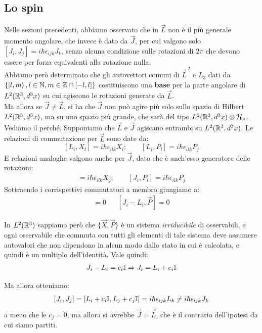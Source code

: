 \documentclass[../../FisicaTeorica.tex]{subfiles}
\begin{document}
\subsection{Lo spin}%
Nelle sezioni precedenti, abbiamo osservato che in \MQ $\vec{L}$ non è il più generale momento angolare, che invece è dato da $\vec{J}$, per cui valgono solo $[J_i, J_j]=i\hbar \epsilon_{ijk}J_k$, senza alcuna condizione sulle rotazioni di $2\pi$ che devono essere per forza equivalenti alla rotazione nulla.\\
Abbiamo però determinato che gli autovettori comuni di $\vec{L}^{\,2}$ e $L_3$ dati da $\{\ket{l,m}, l\in \mathbb{N}, m \in \mathbb{Z}\cap [-l,l]\}$ costituiscono una \textbf{base} per la parte angolare di $L^2(\mathbb{R}^3, d^3x)$ su cui agiscono le rotazioni generate da $\vec{L}$.\\
Ma allora se $\vec{J}\neq \vec{L}$, si ha che $\vec{J}$ non può agire più solo sullo spazio di Hilbert $L^2(\mathbb{R}^3, d^3x)$, ma su uno spazio più grande, che sarà del tipo $L^2(\mathbb{R}^3, d^3x)\otimes \mathcal{H}_s$.\\
Vediamo il perché. Supponiamo che $\vec{L}$ e $\vec{J}$ agiscano entrambi su $L^2(\mathbb{R}^3, d^3x)$. Le relazioni di commutazione per $\vec{L}$ sono date da:
\[
[L_i, X_l] = i\hbar \epsilon_{ilk} X_l; \qquad [L_i, P_l]=i\hbar \epsilon_{ilk} P_j
\]
E relazioni analoghe valgono anche per $\vec{J}$, dato che è anch'esso generatore delle rotazioni:
\begin{align*}
[J_i,X_l]=i\hbar \epsilon_{ilk} X_j; \qquad [J_i, P_l]=i\hbar \epsilon_{ilk} P_j
\end{align*}
Sottraendo i corrispettivi commutatori a membro giungiamo a:
\begin{align*}
[J_i-L_i, \vec{X}]=0 && [J_i-L_i, \vec{P}]=0
\end{align*}

In $L^2(\mathbb{R}^3)$ sappiamo però che $\{\vec{X},\vec{P}\}$ è un sistema \textit{irriducibile} di osservabili, e ogni osservabile che commuta con tutti gli elementi di tale sistema deve assumere autovalori che non dipendono in alcun modo dallo stato in cui è calcolata, e quindi è un multiplo dell'identità. Vale quindi:
\begin{align*}
J_i-L_i = c_i \mathbb{I} \Rightarrow J_i =L_i + c_i\mathbb{I}
\end{align*}

Ma allora otteniamo:
\[
[J_i, J_j]=[L_i + c_i \mathbb{I}, L_j + c_j \mathbb{I}]=i\hbar \epsilon_{ijk}L_k \neq i\hbar \epsilon_{ijk}J_k
\]
a meno che le $c_j = 0$, ma allora si avrebbe $\vec{J}=\vec{L}$, che è il contrario dell'ipotesi da cui siamo partiti.\\
\end{document}
